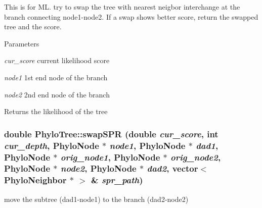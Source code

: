 This is for ML. try to swap the tree with nearest neigbor interchange at the branch connecting node1-\/node2. If a swap shows better score, return the swapped tree and the score. 
\begin{DoxyParams}{Parameters}
\item[{\em cur\_\-score}]current likelihood score \item[{\em node1}]1st end node of the branch \item[{\em node2}]2nd end node of the branch \end{DoxyParams}
\begin{DoxyReturn}{Returns}
the likelihood of the tree 
\end{DoxyReturn}
\hypertarget{classPhyloTree_a50a289b7af25842a1401856fee67d725}{
\subsubsection[{swapSPR}]{\setlength{\rightskip}{0pt plus 5cm}double PhyloTree::swapSPR (double {\em cur\_\-score}, \/  int {\em cur\_\-depth}, \/  {\bf PhyloNode} $\ast$ {\em node1}, \/  {\bf PhyloNode} $\ast$ {\em dad1}, \/  {\bf PhyloNode} $\ast$ {\em orig\_\-node1}, \/  {\bf PhyloNode} $\ast$ {\em orig\_\-node2}, \/  {\bf PhyloNode} $\ast$ {\em node2}, \/  {\bf PhyloNode} $\ast$ {\em dad2}, \/  vector$<$ {\bf PhyloNeighbor} $\ast$ $>$ \& {\em spr\_\-path})}}
\label{classPhyloTree_a50a289b7af25842a1401856fee67d725}
move the subtree (dad1-\/node1) to the branch (dad2-\/node2) 


